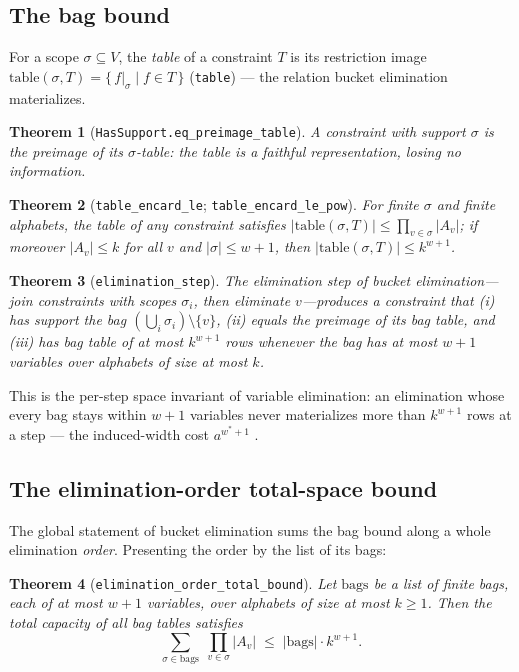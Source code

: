 \documentclass[11pt]{article}
\newtheorem{theorem}{Theorem}
\newcommand{\lean}[1]{\texttt{#1}}
\begin{document}
\subsection*{The bag bound}

For a scope $\sigma \subseteq V$, the \emph{table} of a constraint $T$
is its restriction image
$\mathrm{table}(\sigma, T) = \{\, f|_\sigma \mid f \in T \,\}$
(\lean{table}) --- the relation bucket elimination materializes.

\begin{theorem}[\lean{HasSupport.eq\_preimage\_table}]
A constraint with support $\sigma$ is the preimage of its
$\sigma$-table: the table is a faithful representation, losing no
information.
\end{theorem}

\begin{theorem}[\lean{table\_encard\_le};
\lean{table\_encard\_le\_pow}]
For finite $\sigma$ and finite alphabets, the table of \emph{any}
constraint satisfies
$|\mathrm{table}(\sigma, T)| \le \prod_{v \in \sigma} |A_v|$; if
moreover $|A_v| \le k$ for all $v$ and $|\sigma| \le w + 1$, then
$|\mathrm{table}(\sigma, T)| \le k^{w+1}$.
\end{theorem}

\begin{theorem}[\lean{elimination\_step}]
The elimination step of bucket elimination---join constraints with
scopes $\sigma_i$, then eliminate $v$---produces a constraint that
(i) has support the bag $(\bigcup_i \sigma_i) \setminus \{v\}$,
(ii) equals the preimage of its bag table, and (iii) has bag table of
at most $k^{w+1}$ rows whenever the bag has at most $w+1$ variables
over alphabets of size at most $k$.
\end{theorem}

This is the per-step space invariant of variable elimination: an
elimination whose every bag stays within $w + 1$ variables never
materializes more than $k^{w+1}$ rows at a step --- the induced-width
cost $a^{w^* + 1}$ \citep{dechter2003constraint}.

\subsection*{The elimination-order total-space bound}

The global statement of bucket elimination sums the bag bound along a
whole elimination \emph{order}.  Presenting the order by the list of
its bags:

\begin{theorem}[\lean{elimination\_order\_total\_bound}]
Let $\mathrm{bags}$ be a list of finite bags, each of at most $w + 1$
variables, over alphabets of size at most $k \ge 1$.  Then the total
capacity of all bag tables satisfies
\[
\sum_{\sigma \in \mathrm{bags}} \; \prod_{v \in \sigma} |A_v|
  \;\le\; |\mathrm{bags}| \cdot k^{w+1}.
\]
\end{theorem}
\end{document}
